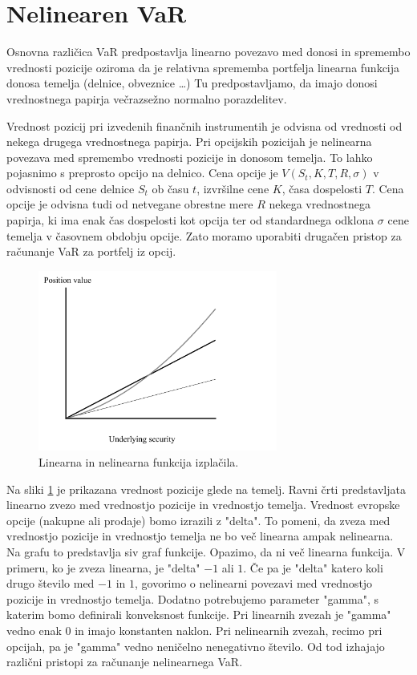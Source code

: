 \documentclass[a4paper, 12pt]{article}
\theoremstyle{definition}
\theoremstyle{plain}
\begin{document}
\section{Nelinearen VaR}

Osnovna različica VaR predpostavlja linearno povezavo med donosi in spremembo vrednosti pozicije
oziroma da je relativna sprememba portfelja linearna funkcija donosa temelja (delnice, obveznice \dots)
Tu predpostavljamo, da imajo donosi vrednostnega papirja večrazsežno normalno porazdelitev.  

Vrednost pozicij pri izvedenih finančnih instrumentih je odvisna od vrednosti od nekega drugega vrednostnega papirja.
Pri opcijskih pozicijah je nelinearna povezava med spremembo vrednosti pozicije in donosom temelja. 
To lahko pojasnimo s preprosto opcijo na delnico. Cena opcije je $V(S_t,K,T,R,\sigma)$ v 
odvisnosti od cene delnice $S_t$ ob času $t$, izvršilne cene $K$, časa dospelosti $T$. 
Cena opcije je odvisna tudi od netvegane obrestne mere $R$ nekega vrednostnega papirja, ki ima enak
čas dospelosti kot opcija ter od standardnega odklona $\sigma$ cene temelja v časovnem obdobju opcije. 
Zato moramo uporabiti drugačen pristop za računanje VaR za portfelj iz opcij. 

\begin{figure}\label{payoff}
    \includegraphics[width=0.7\textwidth]{payoff.jpg}
    \caption{Linearna in nelinearna funkcija izplačila.}
\end{figure}

Na sliki \ref{payoff} je prikazana vrednost pozicije glede na temelj. 
Ravni črti predstavljata linearno zvezo med vrednostjo pozicije in vrednostjo temelja. 
Vrednost evropske opcije (nakupne ali prodaje) bomo izrazili z "delta". To pomeni, da zveza
med vrednostjo pozicije in vrednostjo temelja ne bo več linearna ampak nelinearna. Na grafu to 
predstavlja siv graf funkcije. Opazimo, da ni več linearna funkcija.
V primeru, ko je zveza linearna, je "delta" $-1$ ali $1$. Če pa je "delta" katero koli drugo število
med $-1$ in $1$, govorimo o nelinearni povezavi med vrednostjo pozicije in vrednostjo temelja.
Dodatno potrebujemo parameter "gamma", s katerim bomo definirali konveksnost funkcije. Pri linearnih zvezah
je "gamma" vedno enak $0$ in imajo konstanten naklon. Pri nelinearnih zvezah, recimo pri opcijah, pa je 
"gamma" vedno neničelno nenegativno število. Od tod izhajajo različni pristopi za računanje nelinearnega VaR.
\end{document}
